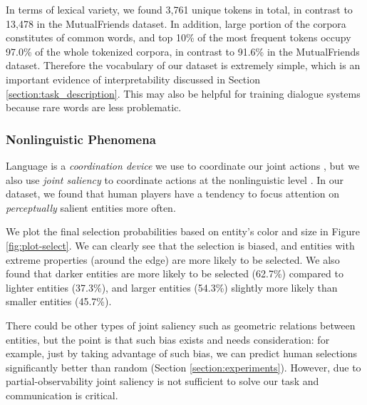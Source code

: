 \documentclass[letterpaper]{article}
\begin{document}
In terms of lexical variety, we found 3,761 unique tokens in total, in contrast to 13,478 in the MutualFriends dataset. In addition, large portion of the corpora constitutes of common words, and top 10\% of the most frequent tokens occupy 97.0\% of the whole tokenized corpora, in contrast to 91.6\% in the MutualFriends dataset. Therefore the vocabulary of our dataset is extremely simple, which is an important evidence of interpretability discussed in Section \ref{section:task_description}. This may also be helpful for training dialogue systems because rare words are less problematic.

\subsubsection{Nonlinguistic Phenomena}

Language is a \emph{coordination device} we use to coordinate our joint actions \cite{lewis1969convention}, but we also use \emph{joint saliency} to coordinate actions at the nonlinguistic level \cite{schelling1980strategy}. In our dataset, we found that human players have a tendency to focus attention on \emph{perceptually} salient entities more often.

We plot the final selection probabilities based on entity's color and size in Figure \ref{fig:plot-select}. We can clearly see that the selection is biased, and entities with extreme properties (around the edge) are more likely to be selected. We also found that darker entities are more likely to be selected (62.7\%) compared to lighter entities (37.3\%), and larger entities (54.3\%) slightly more likely than smaller entities (45.7\%).

There could be other types of joint saliency such as geometric relations between entities, but the point is that such bias exists and needs consideration: for example, just by taking advantage of such bias, we can predict human selections significantly better than random (Section \ref{section:experiments}). However, due to partial-observability joint saliency is not sufficient to solve our task and communication is critical.
\end{document}
